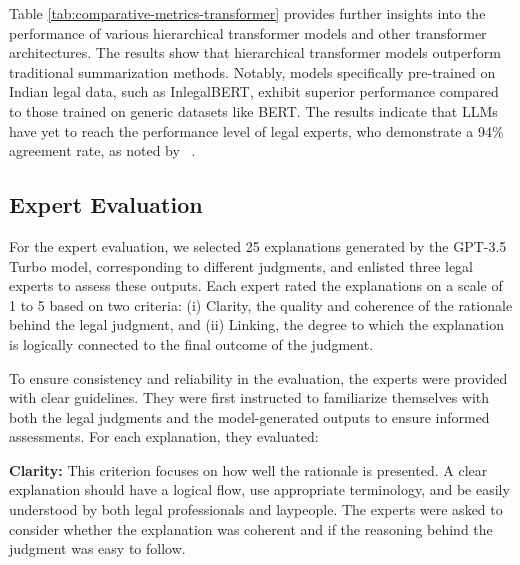 Table \ref{tab:comparative-metrics-transformer} provides further insights into the performance of various hierarchical transformer models and other transformer architectures. The results show that hierarchical transformer models outperform traditional summarization methods. Notably, models specifically pre-trained on Indian legal data, such as InlegalBERT, exhibit superior performance compared to those trained on generic datasets like BERT. The results indicate that LLMs have yet to reach the performance level of legal experts, who demonstrate a 94\% agreement rate, as noted by ~\cite{malik-etal-2021-ildc}.

\subsection{Expert Evaluation}
For the expert evaluation, we selected 25 explanations generated by the GPT-3.5 Turbo model, corresponding to different judgments, and enlisted three legal experts to assess these outputs. Each expert rated the explanations on a scale of 1 to 5 based on two criteria: (i) Clarity, the quality and coherence of the rationale behind the legal judgment, and (ii) Linking, the degree to which the explanation is logically connected to the final outcome of the judgment.

To ensure consistency and reliability in the evaluation, the experts were provided with clear guidelines. They were first instructed to familiarize themselves with both the legal judgments and the model-generated outputs to ensure informed assessments. For each explanation, they evaluated:

\textbf{Clarity:} This criterion focuses on how well the rationale is presented. A clear explanation should have a logical flow, use appropriate terminology, and be easily understood by both legal professionals and laypeople. The experts were asked to consider whether the explanation was coherent and if the reasoning behind the judgment was easy to follow.

